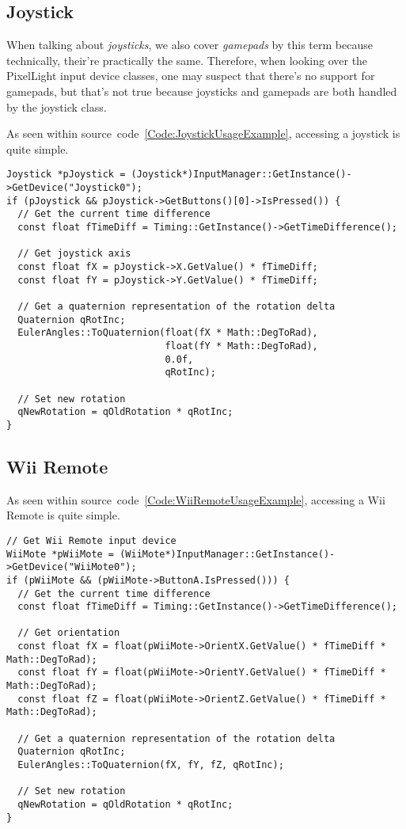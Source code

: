 \subsection{Joystick}
When talking about \emph{joysticks}, we also cover \emph{gamepads} by this term because technically, their're practically the same. Therefore, when looking over the PixelLight input device classes, one may suspect that there's no support for gamepads, but that's not true because joysticks and gamepads are both handled by the joystick class.

As seen within source~code~\ref{Code:JoystickUsageExample}, accessing a joystick is quite simple.
\begin{lstlisting}[float=htb,label=Code:JoystickUsageExample,caption={Joystick usage example}]
Joystick *pJoystick = (Joystick*)InputManager::GetInstance()->GetDevice("Joystick0");
if (pJoystick && pJoystick->GetButtons()[0]->IsPressed()) {
  // Get the current time difference
  const float fTimeDiff = Timing::GetInstance()->GetTimeDifference();

  // Get joystick axis
  const float fX = pJoystick->X.GetValue() * fTimeDiff;
  const float fY = pJoystick->Y.GetValue() * fTimeDiff;

  // Get a quaternion representation of the rotation delta
  Quaternion qRotInc;
  EulerAngles::ToQuaternion(float(fX * Math::DegToRad),
                            float(fY * Math::DegToRad),
                            0.0f,
                            qRotInc);

  // Set new rotation
  qNewRotation = qOldRotation * qRotInc;
}
\end{lstlisting}




\subsection{Wii Remote}
As seen within source~code~\ref{Code:WiiRemoteUsageExample}, accessing a Wii Remote is quite simple.
\begin{lstlisting}[float=htb,label=Code:WiiRemoteUsageExample,caption={Wii Remote usage example}]
// Get Wii Remote input device
WiiMote *pWiiMote = (WiiMote*)InputManager::GetInstance()->GetDevice("WiiMote0");
if (pWiiMote && (pWiiMote->ButtonA.IsPressed())) {
  // Get the current time difference
  const float fTimeDiff = Timing::GetInstance()->GetTimeDifference();

  // Get orientation
  const float fX = float(pWiiMote->OrientX.GetValue() * fTimeDiff * Math::DegToRad);
  const float fY = float(pWiiMote->OrientY.GetValue() * fTimeDiff * Math::DegToRad);
  const float fZ = float(pWiiMote->OrientZ.GetValue() * fTimeDiff * Math::DegToRad);

  // Get a quaternion representation of the rotation delta
  Quaternion qRotInc;
  EulerAngles::ToQuaternion(fX, fY, fZ, qRotInc);

  // Set new rotation
  qNewRotation = qOldRotation * qRotInc;
}
\end{lstlisting}




